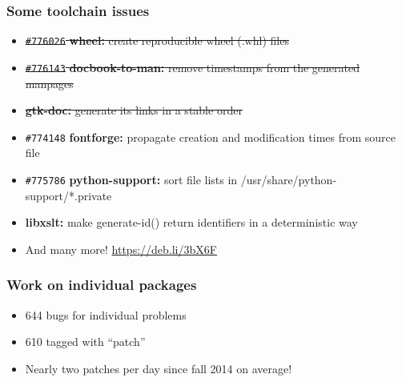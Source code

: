 \documentclass[14pt]{beamer}
\begin{document}
\begin{frame}
 \frametitle{Some toolchain issues}

 \begin{itemize}\small
  \item \sout{\texttt{\#776026} \textbf{wheel:} create reproducible wheel (.whl) files}
  \item \sout{\texttt{\#776143} \textbf{docbook-to-man:} remove timestamps from the generated manpages}
  \item \sout{\textbf{gtk-doc:} generate its links in a stable order}
  \item \texttt{\#774148} \textbf{fontforge:} propagate creation and modification times from source file
  \item \texttt{\#775786} \textbf{python-support:} sort file lists in /usr/share/python-support/*.private
  \item \textbf{libxslt:} make generate-id() return identifiers in a deterministic way
  \item And many more! \url{https://deb.li/3bX6F}
 \end{itemize}
\end{frame}

\begin{frame}
 \frametitle{Work on individual packages}

 \begin{itemize}
  \item 644 bugs for individual problems
  \item 610 tagged with “patch”
  \item Nearly two patches per day since fall 2014 on average!
 \end{itemize}
\end{frame}

\begin{frame}[plain]
\end{frame}
\end{document}
